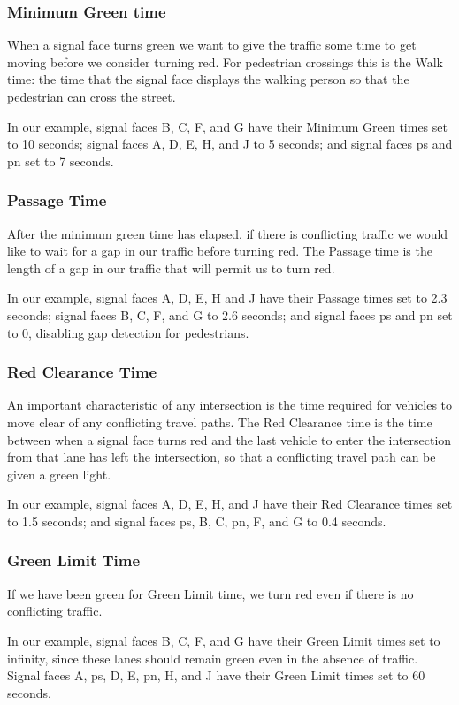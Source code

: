 \documentclass[letterpaper,twoside]{article}
\begin{document}
\subsubsection{Minimum Green time}
When a signal face turns green we want to give the traffic some time
to get moving before we consider turning red.  For pedestrian crossings
this is the Walk time: the time that the signal face displays the walking
person so that the pedestrian can cross the street.

In our example, signal faces B, C, F, and G have their Minimum Green
times set to 10 seconds; signal faces A, D, E, H, and J to 5 seconds;
and signal faces ps and pn set to 7 seconds.

\subsubsection{Passage Time}
After the minimum green time has elapsed, if there is conflicting traffic
we would like to wait for a gap in our traffic before turning red.
The Passage time is the length of a gap in our traffic that will permit us
to turn red.

In our example, signal faces A, D, E, H and J have their Passage times
set to 2.3 seconds; signal faces B, C, F, and G to 2.6 seconds; and
signal faces ps and pn set to 0, disabling gap detection for pedestrians.

\subsubsection{Red Clearance Time}
An important characteristic of any intersection is the time required
for vehicles to move clear of any conflicting travel paths.
The Red Clearance time is the time between when a signal face turns red
and the last vehicle to enter the intersection from that lane has left the
intersection, so that a conflicting travel path can be given a green light.

In our example, signal faces A, D, E, H, and J have their Red Clearance
times set to 1.5 seconds; and signal faces ps, B, C, pn, F, and G to 0.4
seconds.

\subsubsection{Green Limit Time}
If we have been green for Green Limit time, we turn red even if there is
no conflicting traffic.

In our example, signal faces B, C, F, and G have their Green Limit times
set to infinity, since these lanes should remain green even in the absence
of traffic.  Signal faces A, ps, D, E, pn, H, and J have their Green Limit
times set to 60 seconds.
\end{document}
